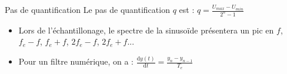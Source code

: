 \documentclass[a4paper, 11pt, french, twocolumn]{article}
\newcommand{\dt}{\mathrm{d}t}
\begin{document}
	\begin{cadre}{Pas de quantification }
		Le pas de quantification $q$ est : $q=\frac{U_{max}-U_{min}}{2^n-1}$
	\end{cadre}
	
	\begin{itemize}
		\item Lors de l'échantillonage, le spectre de la sinusoïde présentera un pic en $f$, $f_e-f$, $f_e+f$, $2f_e-f$, $2f_e+f$...
		\item Pour un filtre numérique, on a : $\frac{\mathrm{d}y(t)}{\dt}=\frac{y_n-y_{n-1}}{T_e}$
	\end{itemize}
\end{document}
